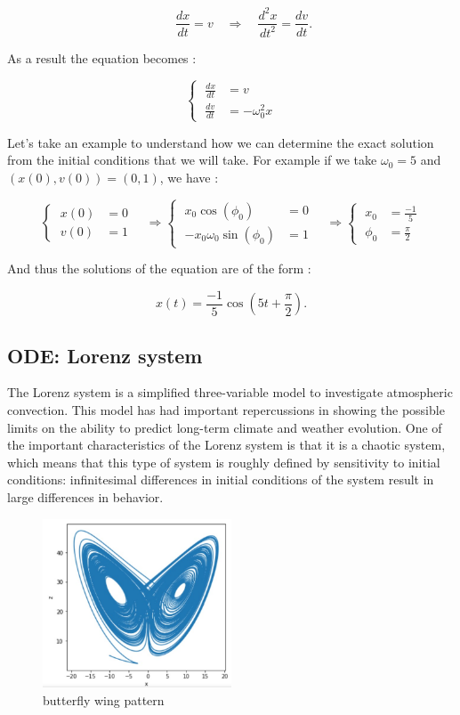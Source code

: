 \documentclass[12pt]{article}
\begin{document}
    $$\qquad \frac{d x}{d t}=v \quad \Rightarrow \quad \frac{d^2 x}{d t^2}=\frac{d v}{d t}.$$
    
    \noindent As a result the equation becomes :
    
    $$\left\{\;\begin{aligned}
    	\frac{d x}{d t}&=v \\
    	\frac{d v}{d t}&=-\omega_0^2 x
    \end{aligned}\right.
    $$
    
    \noindent Let's take an example to understand how we can determine the exact solution from the initial conditions that we will take. For example if we take $\omega_0=5$ and $(x(0),v(0))=(0,1)$, we have :
    
    $$\left\{\;\begin{aligned}
    	x(0)&=0 \\
    	v(0)&=1
    \end{aligned}\right. \quad \Rightarrow 
    \left\{\;\begin{aligned}
    	x_0 \cos(\phi_0)&=0 \\
    	-x_0 \omega_{0} \sin(\phi_0)&=1
    \end{aligned}\right.  \quad \Rightarrow  
    \left\{\;\begin{aligned}
    	x_0&=\frac{-1}{5} \\
    	\phi_0&=\frac{\pi}{2}
    \end{aligned}\right.
    $$
    
    \noindent And thus the solutions of the equation are of the form :
    
    $$x(t) = \frac{-1}{5}\cos(5t+\frac{\pi}{2}).$$
    \subsection{ODE: Lorenz system}
	\label{lorenz_ode}
	\noindent The Lorenz system is a simplified three-variable model to investigate atmospheric convection. This model has had important repercussions in showing the possible limits on the ability to predict long-term climate and weather evolution. One of the important characteristics of the Lorenz system is 
	that it is a chaotic system, which means that this type of system is roughly defined by sensitivity to initial conditions: infinitesimal differences in initial conditions of the system result in large differences in behavior.
	\begin{figure}[H]   
		\centering
		\includegraphics[width=0.5\textwidth]{"images/butterfly.jpg"}
		\caption{butterfly wing pattern}
		\label{but_wing}
	\end{figure}	
	
\end{document}
